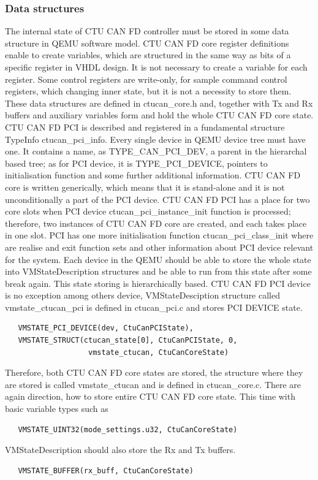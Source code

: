 \documentclass{ctuthesis}
\begin{document}
  \subsubsection{Data structures}
  The internal state of CTU CAN FD controller must be stored in some data structure in QEMU software model. CTU CAN FD core register definitions enable to create variables, which are structured in the same way as bits of a specific register in VHDL design. It is not necessary to create a variable for each register. Some control registers are write-only, for sample command control registers, which changing inner state, but it is not a necessity to store them. These data structures are defined in ctucan\_core.h and, together with Tx and Rx buffers and auxiliary variables form and hold the whole CTU CAN FD core state. \\
  CTU CAN FD PCI is described and registered in a fundamental structure TypeInfo ctucan\_pci\_info. Every single device in QEMU device tree must have one. It contains a name, as TYPE\_CAN\_PCI\_DEV, a parent in the hierarchal based tree; as for PCI device, it is TYPE\_PCI\_DEVICE, pointers to initialisation function and some further additional information. CTU CAN FD core is written generically, which means that it is stand-alone and it is not unconditionally a part of the PCI device. CTU CAN FD PCI has a place for two core slots when PCI device ctucan\_pci\_instance\_init function is processed; therefore, two instances of CTU CAN FD core are created, and each takes place in one slot. PCI has one more initialisation function ctucan\_pci\_class\_init where are realise and exit function sets and other information about PCI device relevant for the system. 
Each device in the QEMU should be able to store the whole state into VMStateDescription structures and be able to run from this state after some break again. This state storing is hierarchically based. CTU CAN FD PCI device is no exception among others device, VMStateDesciption structure called vmstate\_ctucan\_pci is defined in ctucan\_pci.c and stores PCI DEVICE state.
   \begin{verbatim}   VMSTATE_PCI_DEVICE(dev, CtuCanPCIState),
   VMSTATE_STRUCT(ctucan_state[0], CtuCanPCIState, 0,
                   vmstate_ctucan, CtuCanCoreState)\end{verbatim}
  Therefore, both CTU CAN FD core states are stored, the structure where they are stored is called vmstate\_ctucan and is defined in ctucan\_core.c. There are again direction, how to store entire CTU CAN FD core state. This time with basic variable types such as
   \begin{verbatim}   VMSTATE_UINT32(mode_settings.u32, CtuCanCoreState)\end{verbatim}
  VMStateDescription should also store the Rx and Tx buffers.
  \begin{verbatim}   VMSTATE_BUFFER(rx_buff, CtuCanCoreState)\end{verbatim}
 
\end{document}
